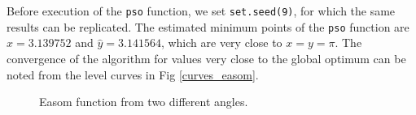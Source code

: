 \documentclass[10pt,letterpaper]{article}
\begin{document}
Before execution of the \texttt{pso} function, we set \texttt{set.seed(9)}, for which the same results can be replicated.
The estimated minimum points of the \texttt{pso} function are $\widehat{x} = 3.139752$ and $\widehat{y} = 3.141564$, which are very close to $x=y=\pi$.
The convergence of the algorithm for  values very close to the global optimum can be noted from the level curves  in Fig \ref{curves_easom}.

\begin{figure}[H]
\centering
\subfigure{
	\label{fig:easom1}
}
\subfigure{
	\label{fig:easom2}
}
\caption{Easom function from two different angles.}
\label{fig:easom}
\end{figure}
\end{document}
